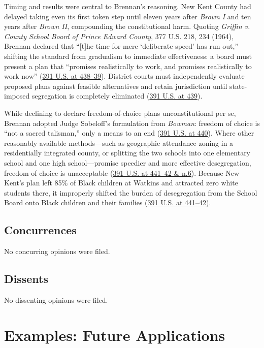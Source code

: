 \documentclass[12pt]{article}
\begin{document}
Timing and results were central to Brennan's reasoning. New Kent County had delayed taking even its first token step until eleven years after \textit{Brown I} and ten years after \textit{Brown II}, compounding the constitutional harm. Quoting \textit{Griffin v. County School Board of Prince Edward County}, 377 U.S. 218, 234 (1964), Brennan declared that ``[t]he time for mere `deliberate speed' has run out,'' shifting the standard from gradualism to immediate effectiveness: a board must present a plan that ``promises realistically to work, and promises realistically to work now'' (\href{https://supreme.justia.com/cases/federal/us/391/430/}{391 U.S. at 438--39}). District courts must independently evaluate proposed plans against feasible alternatives and retain jurisdiction until state-imposed segregation is completely eliminated (\href{https://supreme.justia.com/cases/federal/us/391/430/}{391 U.S. at 439}).

While declining to declare freedom-of-choice plans unconstitutional per se, Brennan adopted Judge Sobeloff's formulation from \textit{Bowman}: freedom of choice is ``not a sacred talisman,'' only a means to an end (\href{https://supreme.justia.com/cases/federal/us/391/430/}{391 U.S. at 440}). Where other reasonably available methods---such as geographic attendance zoning in a residentially integrated county, or splitting the two schools into one elementary school and one high school---promise speedier and more effective desegregation, freedom of choice is unacceptable (\href{https://supreme.justia.com/cases/federal/us/391/430/}{391 U.S. at 441--42 \& n.6}). Because New Kent's plan left 85\% of Black children at Watkins and attracted zero white students there, it improperly shifted the burden of desegregation from the School Board onto Black children and their families (\href{https://supreme.justia.com/cases/federal/us/391/430/}{391 U.S. at 441--42}).

\subsection{Concurrences}

No concurring opinions were filed.

\subsection{Dissents}

No dissenting opinions were filed.

\section{Examples: Future Applications}
\end{document}
